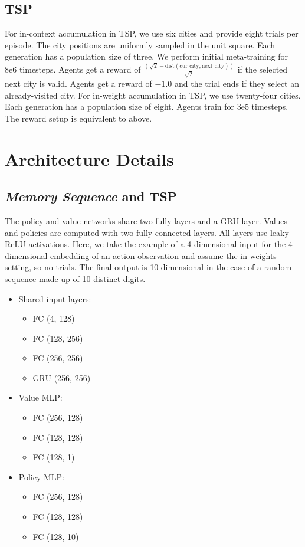 \documentclass{article}
\begin{document}
\subsection{TSP}
For in-context accumulation in TSP, we use six cities and provide eight trials per episode. The city positions are uniformly sampled in the unit square. Each generation has a population size of three. We perform initial meta-training for 8e6 timesteps. Agents get a reward of $\frac{(\sqrt{2} - \text{dist}(\text{cur city}, \text{next city}))}{ \sqrt{2}}$ if the selected next city is valid. Agents get a reward of $-1.0$ and the trial ends if they select an already-visited city.
For in-weight accumulation in TSP, we use twenty-four cities. Each generation has a population size of eight. Agents train for 3e5 timesteps. The reward setup is equivalent to above.
\newpage
\section{Architecture Details}
\label{A:arch}
\subsection{\textit{Memory Sequence} and TSP}
The policy and value networks share two fully layers and a GRU layer. Values and policies are computed with two fully connected layers. All layers use leaky ReLU activations. Here, we take the example of a 4-dimensional input for the 4-dimensional embedding of an action observation and assume the in-weights setting, so no trials. The final output is 10-dimensional in the case of a random sequence made up of 10 distinct digits.
\begin{itemize}
\item{Shared input layers:}
\begin{itemize}
\item{FC (4, 128)}
\item{FC (128, 256)}
\item{FC (256, 256)}
\item{GRU (256, 256)}
\end{itemize}
\item{Value MLP:}
\begin{itemize}
\item{FC (256, 128)}
\item{FC (128, 128)}
\item{FC (128, 1)}
\end{itemize}
\item{Policy MLP:}
\begin{itemize}
\item{FC (256, 128)}
\item{FC (128, 128)}
\item{FC (128, 10)}
\end{itemize}
\end{itemize}
\end{document}
